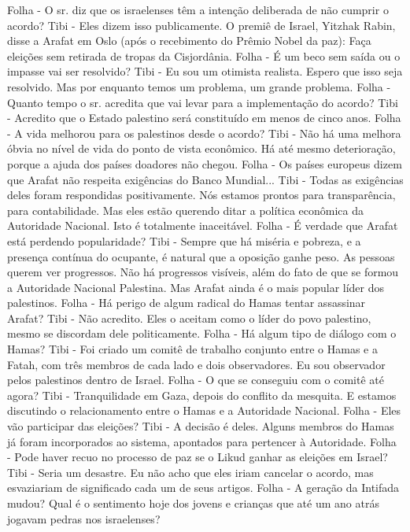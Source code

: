 Folha - O sr. diz que os israelenses têm a intenção deliberada de não cumprir o acordo?
Tibi - Eles dizem isso publicamente. O premiê de Israel, Yitzhak Rabin, disse a Arafat em Oslo (após o recebimento do Prêmio Nobel da paz):  Faça eleições sem retirada de tropas da Cisjordânia.
Folha - É um beco sem saída ou o impasse vai ser resolvido?
Tibi - Eu sou um otimista realista. Espero que isso seja resolvido. Mas por enquanto temos um problema, um grande problema.
Folha - Quanto tempo o sr. acredita que vai levar para a implementação do acordo?
Tibi - Acredito que o Estado palestino será constituído em menos de cinco anos.
Folha - A vida melhorou para os palestinos desde o acordo?
Tibi - Não há uma melhora óbvia no nível de vida do ponto de vista econômico. Há até mesmo deterioração, porque a ajuda dos países doadores não chegou.
Folha - Os países europeus dizem que Arafat não respeita exigências do Banco Mundial...
Tibi - Todas as exigências deles foram respondidas positivamente. Nós estamos prontos para transparência, para contabilidade. Mas eles estão querendo ditar a política econômica da Autoridade Nacional. Isto é totalmente inaceitável.
Folha - É verdade que Arafat está perdendo popularidade?
Tibi - Sempre que há miséria e pobreza, e a presença contínua do ocupante, é natural que a oposição ganhe peso. As pessoas querem ver progressos. Não há progressos visíveis, além do fato de que se formou a Autoridade Nacional Palestina. Mas Arafat ainda é o mais popular líder dos palestinos.
Folha - Há perigo de algum radical do Hamas tentar assassinar Arafat?
Tibi - Não acredito. Eles o aceitam como o líder do povo palestino, mesmo se discordam dele politicamente.
Folha - Há algum tipo de diálogo com o Hamas?
Tibi - Foi criado um comitê de trabalho conjunto entre o Hamas e a Fatah, com três membros de cada lado e dois observadores. Eu sou observador pelos palestinos dentro de Israel.
Folha - O que se conseguiu com o comitê até agora?
Tibi - Tranquilidade em Gaza, depois do conflito da mesquita. E estamos discutindo o relacionamento entre o Hamas e a Autoridade Nacional.
Folha - Eles vão participar das eleições?
Tibi - A decisão é deles. Alguns membros do Hamas já foram incorporados ao sistema, apontados para pertencer à Autoridade.
Folha - Pode haver recuo no processo de paz se o Likud ganhar as eleições em Israel?
Tibi - Seria um desastre. Eu não acho que eles iriam cancelar o acordo, mas esvaziariam de significado cada um de seus artigos.
Folha - A geração da Intifada mudou? Qual é o sentimento hoje dos jovens e crianças que até um ano atrás jogavam pedras nos israelenses?
